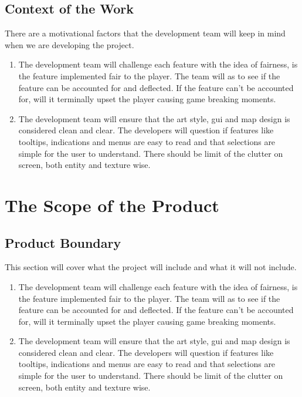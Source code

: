 \documentclass{article}
\begin{document}
\subsection{Context of the Work}
\quad There are a motivational factors that the development team will keep in mind when we are developing the project.
\begin{enumerate}[{CW}1. ]
	\item The development team will challenge each feature with the idea of fairness, is the feature implemented fair to the player. The team will as to see if the feature can be accounted for and deflected. If the feature can't be accounted for, will it terminally upset the player causing game breaking moments.
	\item The development team will ensure that the art style, gui and map design is considered clean and clear. The developers will question if features like tooltips, indications and menus are easy to read and that selections are simple for the user to understand.  There should be limit of the clutter on screen, both entity and texture wise.
\end{enumerate}
\section{The Scope of the Product}
\subsection{Product Boundary}
\quad This section will cover what the project will include and what it will not include.
\begin{enumerate}[{PB}1. ]
	\item The development team will challenge each feature with the idea of fairness, is the feature implemented fair to the player. The team will as to see if the feature can be accounted for and deflected. If the feature can't be accounted for, will it terminally upset the player causing game breaking moments.
	\item The development team will ensure that the art style, gui and map design is considered clean and clear. The developers will question if features like tooltips, indications and menus are easy to read and that selections are simple for the user to understand.  There should be limit of the clutter on screen, both entity and texture wise.
\end{enumerate}
\end{document}
